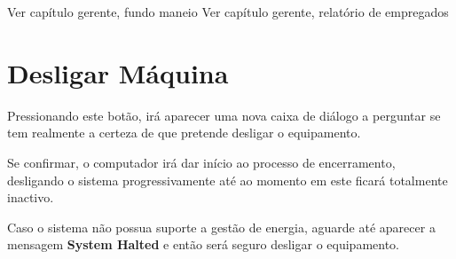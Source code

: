 \documentclass[a4paper,11pt,openany]{memoir}
\begin{document}
Ver capítulo gerente, fundo maneio
Ver capítulo gerente, relatório de empregados


\section{Desligar Máquina}

Pressionando este botão, irá aparecer uma nova caixa de diálogo a perguntar se tem realmente a certeza
de que pretende desligar o equipamento.

Se confirmar, o computador irá dar início ao processo de encerramento, desligando o sistema progressivamente
até ao momento em este ficará totalmente inactivo.

\begin{boxedminipage}{\textwidth}
        Caso o sistema não possua suporte a gestão de energia,
	aguarde até aparecer a mensagem \textbf{System Halted} e então será seguro desligar o equipamento.
\end{boxedminipage}













\end{document}
